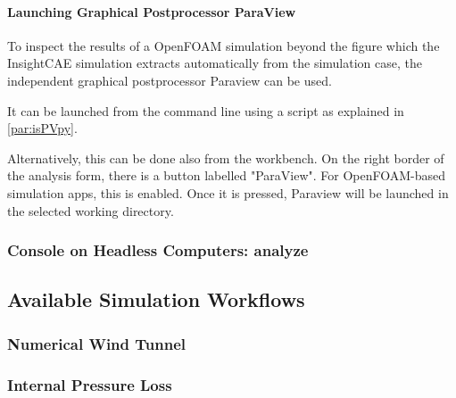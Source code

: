 \paragraph{Launching Graphical Postprocessor ParaView}

To inspect the results of a OpenFOAM simulation beyond the figure which the InsightCAE simulation extracts automatically from the simulation case, the independent graphical postprocessor Paraview can be used.

It can be launched from the command line using a script as explained in \ref{par:isPVpy}.

Alternatively, this can be done also from the workbench. On the right border of the analysis form, there is a button labelled "ParaView".
For OpenFOAM-based simulation apps, this is enabled.
Once it is pressed, Paraview will be launched in the selected working directory.

\subsubsection{Console on Headless Computers: analyze}\label{sec:analyze}


\subsection{Available Simulation Workflows}

\subsubsection{Numerical Wind Tunnel}

\subsubsection{Internal Pressure Loss}
